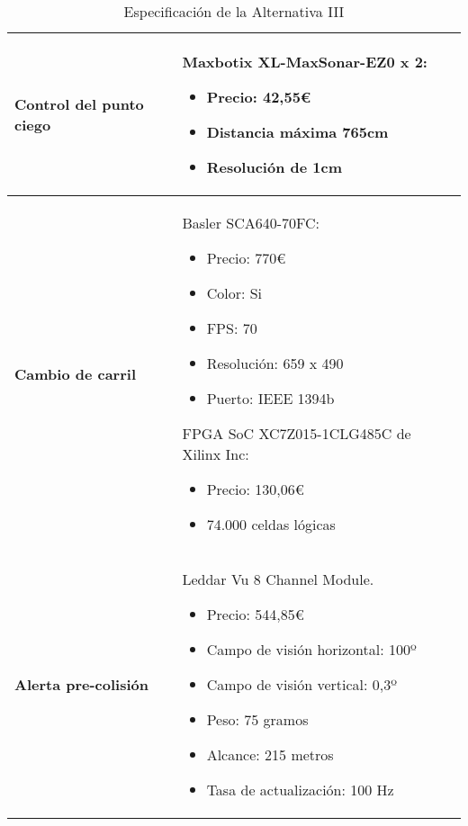\begin{table}[H]
\begin{center}
\begin{tabular}{p{5cm} p{8cm}}
\textbf{Control del punto ciego} &
Maxbotix XL-MaxSonar-EZ0 x 2:
\begin{itemize}
    \item Precio: 42,55\euro
    \item Distancia máxima 765cm
    \item Resolución de 1cm
\end{itemize}
\\ \hline

\textbf{Cambio de carril} &
Basler SCA640-70FC:
\begin{itemize}
    \item Precio: 770\euro
    \item Color: Si
    \item FPS: 70
    \item Resolución: 659 x 490
    \item Puerto: IEEE 1394b
\end{itemize}
FPGA SoC XC7Z015-1CLG485C de Xilinx Inc:
\begin{itemize}
    \item Precio: 130,06\euro
    \item 74.000 celdas lógicas
\end{itemize}
\\ \hline

\textbf{Alerta pre-colisión} &
Leddar Vu 8 Channel Module.
\begin{itemize}
    \item Precio: 544,85\euro
    \item Campo de visión horizontal: 100º
    \item Campo de visión vertical: 0,3º
    \item Peso: 75 gramos
    \item Alcance: 215 metros
    \item Tasa de actualización: 100 Hz
\end{itemize}
\\ \hline

\end{tabular}
\caption{Especificación de la Alternativa III}
\label{tab:altIII}
\end{center}
\end{table}
